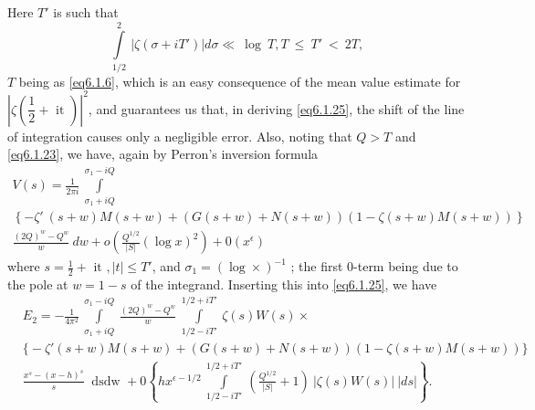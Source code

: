 Here $T'$ is such that
$$
\int\limits_{1/2}^{2} ~ | \zeta(\sigma + iT') | d\sigma \ll ~ \log ~
T, T~ \le ~ T'~ < ~2T, 
$$
$T$ being as \eqref{eq6.1.6}, which is an easy consequence of the mean value
estimate for $| \zeta(\dfrac{1}{2} + \text{ it })|^2$, and guarantees
us that, in deriving \eqref{eq6.1.25}, the shift of the line of integration
causes only a negligible error. Also, noting that $Q > T$ and
\eqref{eq6.1.23}, we have, again by Perron's inversion formula 
\begin{multline*}
  V(s) = \frac{1}{2 \pi i}~\int\limits_{\sigma_1 + iQ}^{\sigma_1 -
  iQ}\\ 
  \left\{ -\zeta' ~ (s+w)M(s+w)+(G(s+w)+N(s+w))(1-\zeta(s+w)M(s+w))
  \right\}\\ 
  \frac{(2Q)^w - {Q^w}}{w} ~ dw + o\left(\frac{Q^{1/2}}{|S|}(\log
  x)^2\right) + 0(x^{\epsilon }) 
\end{multline*}
where $s = \frac{1}{2} + \text{ it }, | t | \le T'$,  and $\sigma_1 =
(\log \times)^{-1}$ ; the first $0$-term being due to the pole at $w =
1 -s$ of the integrand. Inserting this into \eqref{eq6.1.25}, we have 
\begin{align*}
  & E_2  = - \frac{1}{4\pi^2} ~ \int\limits_{\sigma_1 + iQ}^{\sigma_1 -
    iQ} ~ \frac{(2Q)^w - Q^w}{w} ~ \int\limits_{1/2 - iT'}^{1/2 + iT'}
  ~ \zeta(s)W(s) \times \\ 
  & \big\{
  -\zeta'(s+w)M(s+w)+(G(s+w)+N(s+w))(1-\zeta(s+w)M(s+w))
  \big\}\\
  & \frac{x^s-(x-h)^s}{s}~\text{ dsdw } 
   + 0\left\{hx^{\epsilon  - 1/2} ~ \int\limits_{1/2-iT'}^{1/2 +
    iT'} ~ \left(\frac{Q^{1/2}}{|S|} + 1\right)~ | \zeta (s)W(s)|~ | ds
  |\right\}.  
\end{align*}\pageoriginale

